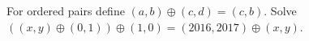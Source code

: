 For ordered pairs define $(a,b)\oplus(c,d)=(c,b)$. Solve $((x,y)\oplus(0,1))\oplus(1,0)=(2016,2017)\oplus(x,y)$.
